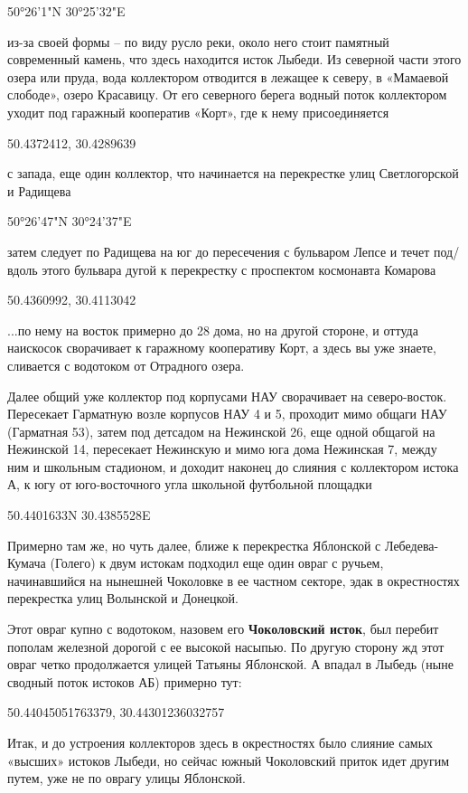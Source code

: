 50°26'1"N 30°25'32"E

из-за своей формы – по виду русло реки, около него стоит памятный современный камень, что здесь находится исток Лыбеди. Из северной части этого озера или пруда, вода коллектором отводится в лежащее к северу, в «Мамаевой слободе», озеро Красавицу. От его северного берега водный поток коллектором уходит под гаражный кооператив «Корт», где к нему присоединяется

50.4372412, 30.4289639

с запада, еще один коллектор, что начинается на перекрестке улиц Светлогорской и Радищева

50°26'47"N 30°24'37"E 

затем следует по Радищева на юг до пересечения с бульваром Лепсе и течет под/вдоль этого бульвара дугой к перекрестку с проспектом космонавта Комарова

50.4360992, 30.4113042

...по нему на восток примерно до 28 дома, но на другой стороне, и оттуда наискосок сворачивает к гаражному кооперативу Корт, а здесь вы уже знаете, сливается с водотоком от Отрадного озера.

Далее общий уже коллектор под корпусами НАУ сворачивает на северо-восток. Пересекает Гарматную возле корпусов НАУ 4 и 5, проходит мимо общаги НАУ (Гарматная 53), затем под детсадом на Нежинской 26, еще одной общагой на Нежинской 14, пересекает Нежинскую и мимо юга дома Нежинская 7, между ним и школьным стадионом, и доходит наконец до слияния с коллектором истока А, к югу от юго-восточного угла школьной футбольной площадки

50.4401633N 30.4385528E

Примерно там же, но чуть далее, ближе к перекрестка Яблонской с Лебедева-Кумача (Голего) к двум истокам подходил еще один овраг с ручьем, начинавшийся на нынешней Чоколовке в ее частном секторе, эдак в окрестностях перекрестка улиц Волынской и Донецкой.

Этот овраг купно с водотоком, назовем его \textbf{Чоколовский исток}, был перебит пополам железной дорогой с ее высокой насыпью. По другую сторону жд этот овраг четко продолжается улицей Татьяны Яблонской. А впадал в Лыбедь (ныне сводный поток истоков АБ) примерно тут:

50.44045051763379, 30.44301236032757

Итак, и до устроения коллекторов здесь в окрестностях было слияние самых «высших» истоков Лыбеди, но сейчас южный Чоколовский приток идет другим путем, уже не по оврагу улицы Яблонской.


